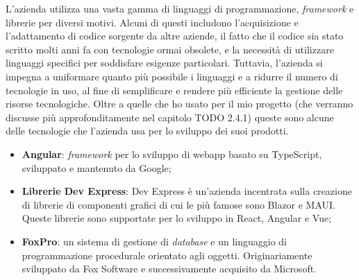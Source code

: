 L'azienda utilizza una vasta gamma di linguaggi di programmazione, \textit{framework} e librerie per diversi motivi. Alcuni di questi includono l'acquisizione 
e l'adattamento di codice sorgente da altre aziende, il fatto che il codice sia stato scritto molti anni fa con tecnologie ormai obsolete, e la necessità di utilizzare 
linguaggi specifici per soddisfare esigenze particolari. Tuttavia, l'azienda si impegna a uniformare quanto più possibile i linguaggi e a ridurre il numero di tecnologie in 
uso, al fine di semplificare e rendere più efficiente la gestione delle risorse tecnologiche. Oltre a quelle che ho usato per il mio progetto (che verranno discusse 
più approfonditamente nel capitolo TODO 2.4.1) queste sono alcune delle tecnologie che l'azienda usa per lo sviluppo dei suoi prodotti.
\begin{itemize}
    \item \textbf{Angular}: \textit{framework} per lo sviluppo di \gls{webapp} basato su TypeScript, sviluppato e mantenuto da Google;
    \item \textbf{Librerie Dev Express}: Dev Express è un'azienda incentrata sulla creazione di librerie di componenti grafici di cui le più famose sono 
          Blazor e MAUI. Queste librerie sono supportate per lo sviluppo in React, Angular e Vue;
    \item \textbf{FoxPro}: un sistema di gestione di \textit{database} e un linguaggio di programmazione procedurale orientato agli oggetti. Originariamente sviluppato 
          da Fox Software e successivamente acquisito da Microsoft. 
\end{itemize}